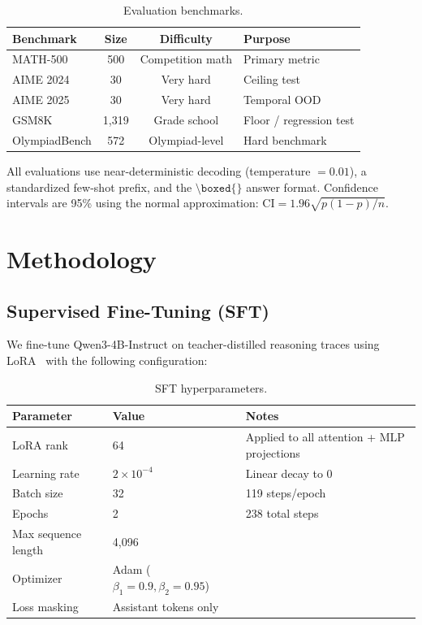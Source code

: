 \documentclass[11pt,a4paper]{article}
\newcommand{\modelname}{Qwen3-4B-Instruct}
\newcommand{\boxedcmd}{\texttt{\textbackslash boxed\{\}}}
\begin{document}
\begin{table}[H]
\centering
\caption{Evaluation benchmarks.}
\label{tab:benchmarks}
\begin{tabular}{lccl}
\toprule
\textbf{Benchmark} & \textbf{Size} & \textbf{Difficulty} & \textbf{Purpose} \\
\midrule
MATH-500 & 500 & Competition math & Primary metric \\
AIME 2024 & 30 & Very hard & Ceiling test \\
AIME 2025 & 30 & Very hard & Temporal OOD \\
GSM8K & 1,319 & Grade school & Floor / regression test \\
OlympiadBench & 572 & Olympiad-level & Hard benchmark \\
\bottomrule
\end{tabular}
\end{table}

All evaluations use near-deterministic decoding (temperature $= 0.01$), a standardized few-shot prefix, and the $\boxedcmd{}$ answer format. Confidence intervals are 95\% using the normal approximation: $\text{CI} = 1.96\sqrt{p(1-p)/n}$.

\section{Methodology}
\label{sec:methodology}

\subsection{Supervised Fine-Tuning (SFT)}

We fine-tune \modelname{} on teacher-distilled reasoning traces using LoRA~\citep{hu2022lora} with the following configuration:

\begin{table}[H]
\centering
\caption{SFT hyperparameters.}
\label{tab:sft-config}
\begin{tabular}{lll}
\toprule
\textbf{Parameter} & \textbf{Value} & \textbf{Notes} \\
\midrule
LoRA rank & 64 & Applied to all attention + MLP projections \\
Learning rate & $2 \times 10^{-4}$ & Linear decay to 0 \\
Batch size & 32 & 119 steps/epoch \\
Epochs & 2 & 238 total steps \\
Max sequence length & 4,096 & \\
Optimizer & Adam ($\beta_1=0.9, \beta_2=0.95$) & \\
Loss masking & Assistant tokens only & \\
\bottomrule
\end{tabular}
\end{table}
\end{document}
